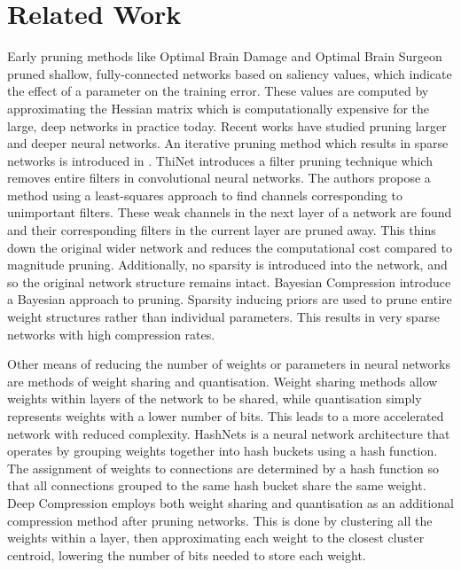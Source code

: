\documentclass[conference]{IEEEtran}
\begin{document}
\section{Related Work}
Early pruning methods like Optimal Brain Damage \cite{lecun1990optimal} and Optimal Brain Surgeon \cite{hassibi1993second} pruned shallow, fully-connected networks based on saliency values, which indicate the effect of a parameter on the training error. These values are computed by approximating the Hessian matrix which is computationally expensive for the large, deep networks in practice today. Recent works have studied pruning larger and deeper neural networks. An iterative pruning method which results in sparse networks is introduced in \cite{han2015alearning}. ThiNet \cite{luo2017thinet} introduces a filter pruning technique which removes entire filters in convolutional neural networks. The authors propose a method using a least-squares approach to find channels corresponding to unimportant filters. These weak channels in the next layer of a network are found and their corresponding filters in the current layer are pruned away. This thins down the original wider network and reduces the computational cost compared to magnitude pruning. Additionally, no sparsity is introduced into the network, and so the original network structure remains intact. Bayesian Compression \cite{louizos2017learning} introduce a Bayesian approach to pruning. Sparsity inducing priors are used to prune entire weight structures rather than individual parameters. This results in very sparse networks with high compression rates. 

Other means of reducing the number of weights or parameters in neural networks are methods of weight sharing and quantisation. Weight sharing methods allow weights within layers of the network to be shared, while quantisation simply represents weights with a lower number of bits. This leads to a more accelerated network with reduced complexity. HashNets \cite{chen2015compressing} is a neural network architecture that operates by grouping weights together into hash buckets using a hash function. The assignment of weights to connections are determined by a hash function so that all connections grouped to the same hash bucket share the same weight. Deep Compression \cite{han2016deep} employs both weight sharing and quantisation as an additional compression method after pruning networks. This is done by clustering all the weights within a layer, then approximating each weight to the closest cluster centroid, lowering the number of bits needed to store each weight.
\end{document}

